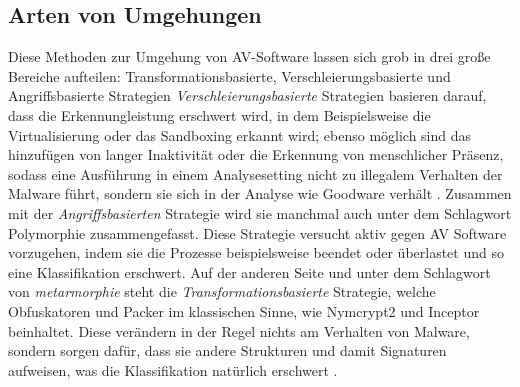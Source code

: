 \subsection{Arten von Umgehungen}
Diese Methoden zur Umgehung von AV-Software lassen sich grob in drei große Bereiche aufteilen: Transformationsbasierte, Verschleierungsbasierte und Angriffsbasierte Strategien \cite{geng_2024_a}
\textit{Verschleierungsbasierte} Strategien basieren darauf, dass die Erkennungleistung erschwert wird, in dem Beispielsweise die Virtualisierung oder das Sandboxing erkannt wird; ebenso möglich sind das hinzufügen von langer Inaktivität  oder die Erkennung von menschlicher Präsenz, sodass eine Ausführung in einem Analysesetting nicht zu illegalem Verhalten der Malware führt, sondern sie sich in der Analyse wie Goodware verhält \cite{geng_2024_a}. Zusammen mit der \textit{Angriffsbasierten} Strategie wird sie manchmal auch unter dem Schlagwort Polymorphie \cite{elsersy_2022_the} zusammengefasst. Diese Strategie versucht aktiv gegen AV Software vorzugehen, indem sie die Prozesse beispielsweise beendet oder überlastet und so eine Klassifikation erschwert\cite{geng_2024_a}. 
Auf der anderen Seite und unter dem Schlagwort von \textit{metarmorphie}\cite{elsersy_2022_the} steht die \textit{Transformationsbasierte} Strategie, welche Obfuskatoren und Packer im klassischen Sinne, wie Nymcrypt2 und Inceptor beinhaltet. Diese verändern in der Regel nichts am Verhalten von Malware\cite{wauters_2024_building}, sondern sorgen dafür, dass sie andere Strukturen und damit Signaturen aufweisen, was die Klassifikation natürlich erschwert \cite{geng_2024_a}.

